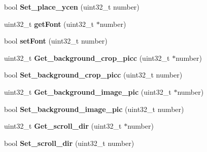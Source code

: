 \begin{DoxyCompactItemize}
\item 
\hypertarget{class_nex_scrolltext_ae1c1181755c9334a4ea21fa2782aecbf}{bool {\bfseries Set\+\_\+place\+\_\+ycen} (uint32\+\_\+t number)}\label{class_nex_scrolltext_ae1c1181755c9334a4ea21fa2782aecbf}

\item 
\hypertarget{class_nex_scrolltext_a2caedb7b97a6028abedaf0b25f9c03e0}{uint32\+\_\+t {\bfseries get\+Font} (uint32\+\_\+t $\ast$number)}\label{class_nex_scrolltext_a2caedb7b97a6028abedaf0b25f9c03e0}

\item 
\hypertarget{class_nex_scrolltext_af2e8602fae103ccadfee037382844ce6}{bool {\bfseries set\+Font} (uint32\+\_\+t number)}\label{class_nex_scrolltext_af2e8602fae103ccadfee037382844ce6}

\item 
\hypertarget{class_nex_scrolltext_a0d8e8997419f4d6460cc1e64f20cfb8c}{uint32\+\_\+t {\bfseries Get\+\_\+background\+\_\+crop\+\_\+picc} (uint32\+\_\+t $\ast$number)}\label{class_nex_scrolltext_a0d8e8997419f4d6460cc1e64f20cfb8c}

\item 
\hypertarget{class_nex_scrolltext_a0a4d02fef0a0a1f9a1e41c66709b97c1}{bool {\bfseries Set\+\_\+background\+\_\+crop\+\_\+picc} (uint32\+\_\+t number)}\label{class_nex_scrolltext_a0a4d02fef0a0a1f9a1e41c66709b97c1}

\item 
\hypertarget{class_nex_scrolltext_a86ffab21e76beed5d801c05b94da6150}{uint32\+\_\+t {\bfseries Get\+\_\+background\+\_\+image\+\_\+pic} (uint32\+\_\+t $\ast$number)}\label{class_nex_scrolltext_a86ffab21e76beed5d801c05b94da6150}

\item 
\hypertarget{class_nex_scrolltext_a629fa1d39761144ec1e421c3c79a51aa}{bool {\bfseries Set\+\_\+background\+\_\+image\+\_\+pic} (uint32\+\_\+t number)}\label{class_nex_scrolltext_a629fa1d39761144ec1e421c3c79a51aa}

\item 
\hypertarget{class_nex_scrolltext_a4a437ad158a3be51e61dd469b77ee450}{uint32\+\_\+t {\bfseries Get\+\_\+scroll\+\_\+dir} (uint32\+\_\+t $\ast$number)}\label{class_nex_scrolltext_a4a437ad158a3be51e61dd469b77ee450}

\item 
\hypertarget{class_nex_scrolltext_ad9ab4f129779d40fe5d108cac8c3a842}{bool {\bfseries Set\+\_\+scroll\+\_\+dir} (uint32\+\_\+t number)}\label{class_nex_scrolltext_ad9ab4f129779d40fe5d108cac8c3a842}


\end{DoxyCompactItemize}
